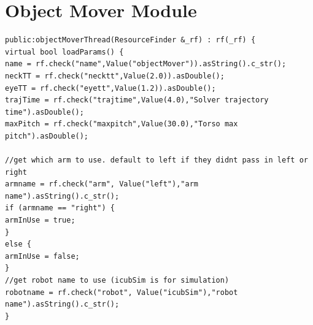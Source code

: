 \documentclass[a4paper, 11pt]{report}
\begin{document}
\section{Object Mover Module}
\begin{lstlisting}
public:objectMoverThread(ResourceFinder &_rf) : rf(_rf) {
virtual bool loadParams() {
name = rf.check("name",Value("objectMover")).asString().c_str();
neckTT = rf.check("necktt",Value(2.0)).asDouble();
eyeTT = rf.check("eyett",Value(1.2)).asDouble();
trajTime = rf.check("trajtime",Value(4.0),"Solver trajectory 
time").asDouble();
maxPitch = rf.check("maxpitch",Value(30.0),"Torso max pitch").asDouble();

//get which arm to use. default to left if they didnt pass in left or right
armname = rf.check("arm", Value("left"),"arm name").asString().c_str();
if (armname == "right") {
armInUse = true;
}
else {
armInUse = false;
}
//get robot name to use (icubSim is for simulation)
robotname = rf.check("robot", Value("icubSim"),"robot name").asString().c_str();
}
\end{lstlisting}

\appendix
\end{document}
